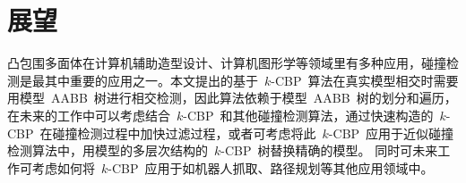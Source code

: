 \section{展望}
\label{sec:futurework}

凸包围多面体在计算机辅助造型设计、计算机图形学等领域里有多种应用，碰撞检测是最其中重要的应用之一。本文提出的基于~$k$-CBP~算法在真实模型相交时需要用模型~AABB~树进行相交检测，因此算法依赖于模型~AABB~树的划分和遍历，
在未来的工作中可以考虑结合~$k$-CBP~和其他碰撞检测算法，通过快速构造的~$k$-CBP~在碰撞检测过程中加快过滤过程，或者可考虑将此~$k$-CBP~应用于近似碰撞检测算法中，用模型的多层次结构的~$k$-CBP~树替换精确的模型。
同时可未来工作可考虑如何将~$k$-CBP~应用于如机器人抓取、路径规划等其他应用领域中。

